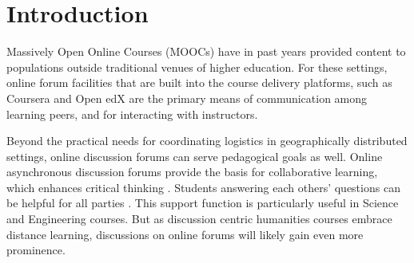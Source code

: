 
\section{Introduction}
Massively Open Online Courses (MOOCs) have in past years provided
content to populations outside traditional venues of higher
education. For these settings, online forum facilities that are
built into the course delivery platforms, such as Coursera and Open
edX are the primary means of communication among learning peers, and
for interacting with instructors.

Beyond the practical needs for coordinating logistics in
geographically distributed settings, online discussion forums can serve pedagogical
goals as well. 
Online asynchronous discussion forums provide the basis for collaborative learning, which enhances critical thinking \cite{gokhale1995collaborative}. Students answering each others' questions can be
helpful for all parties \cite{supers}. This support function is
particularly useful in Science and Engineering courses. But as
discussion centric humanities courses embrace distance learning, discussions
on online forums will likely gain even more prominence.

